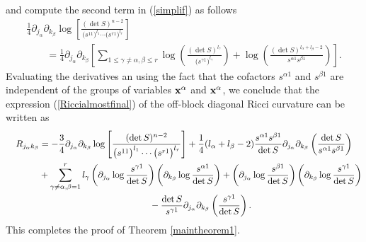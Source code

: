 \documentclass[11pt]{article}
\numberwithin{equation}{section}
\newcommand{\jalpha}{j_{\alpha}}
\newcommand{\kbeta}{k_{\beta}}
\newcommand{\lbeta}{l_{\beta}}
\newcommand{\lalpha}{l_{\alpha}}
\newcommand{\lgamma}{l_{\gamma}}
\begin{document}
and compute the second term in (\ref{simplif}) as follows
\begin{gather*}
\frac{1}{4}\partial_{j_{\alpha}}\partial_{k_{\beta}}\log\left[\frac{(\det S)^{n-2}}{\big(s^{11}\big)^{l_{1}}\cdots \big(s^{r1}\big)^{l_{r}}}\right]\\
\qquad{} =\frac{1}{4}\partial_{j_{\alpha}}\partial_{k_{\beta}}\left[ \sum_{1\leq \gamma \neq \alpha, \beta\leq r} \log\left( \frac{(\det S)^{\lgamma}}{\big(s^{\gamma 1}\big)^{\lgamma}}\right)+\log\left(\frac{(\det S)^{\lalpha+\lbeta-2}}{s^{\alpha 1}s^{\beta 1}}\right)\right].
\end{gather*}
Evaluating the derivatives an using the fact that the cofactors $s^{\alpha 1}$ and $s^{\beta 1}$ are independent of the groups of variables ${\bf x}^{\alpha}$ and ${\bf x}^{\alpha}$, we conclude that the expression (\ref{Riccialmostfinal}) of the off-block diagonal Ricci curvature can be written as
\begin{gather*}
R_{\jalpha \kbeta} =-\frac{3}{4}\partial_{j_{\alpha}}\partial_{k_{\beta}}\log\left[\frac{(\det S)^{n-2}}{\big(s^{11}\big)^{l_{1}}\cdots \big(s^{r1}\big)^{l_{r}}}\right] + \frac{1}{4} (l_{\alpha}+l_{\beta}-2)\frac{s^{\alpha 1}s^{\beta 1}}{\det S}\partial_{j_{\alpha}}\partial_{k_{\beta}}\left(\frac{\det S}{s^{\alpha 1}s^{\beta 1}}\right)\\
\hphantom{R_{\jalpha \kbeta} =}{}+
\sum_{\gamma\neq \alpha,\beta=1}^{r}l_{\gamma}\left(\partial_{j_{\alpha}}\log\frac{s^{\gamma 1}}{\det S}\right)\left(\partial_{k_{\beta}}\log\frac{s^{\alpha 1}}{\det S}\right)
+\left(\partial_{j_{\alpha}}\log\frac{s^{\beta 1}}{\det S}\right)\left(\partial_{k_{\beta}}\log\frac{s^{\gamma 1}}{\det S}\right)\\
\hphantom{R_{\jalpha \kbeta} =}{}
-\frac{\det S}{s^{\gamma 1}}\partial_{\jalpha}\partial_{\kbeta}\left(\frac{s^{\gamma 1}}{\det S}\right).
\end{gather*}
This completes the proof of Theorem \ref{maintheorem1}.
\end{document}
